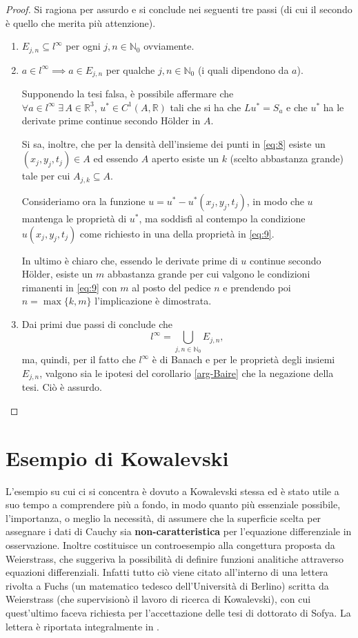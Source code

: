 \begin{proof}
Si ragiona per assurdo e si conclude nei seguenti tre passi (di cui il secondo è quello che merita più attenzione).
\begin{enumerate}
\item
$E_{j,n} \subseteq l^{\infty} $ per ogni $j,n \in \mathbb{N}_0$ ovviamente.
\item
$a \in l^{\infty} \implies a \in E_{j,n}$ per qualche $j,n \in \mathbb{N}_0$ (i quali  dipendono da $a$).

Supponendo la tesi falsa, è possibile affermare che $\forall a \in l^\infty \; \exists \, A \in \mathbb{R}^3, \, u^* \in C^1(A,\mathbb{R})$ tali che si ha che $Lu^*=S_a$ e che $u^*$ ha le derivate prime continue secondo Hölder in $A$.

Si sa, inoltre, che per la densità dell'insieme dei punti in \eqref{eq:8} esiste un $(x_j,y_j,t_j) \in A$ ed essendo $A$ aperto esiste un $k$ (scelto abbastanza grande) tale per cui $A_{j,k} \subseteq A$.

Consideriamo ora la funzione $u=u^*-u^*(x_j,y_j,t_j)$, in modo che $u$ mantenga le proprietà di $u^*$, ma soddisfi al contempo la condizione $u(x_j,y_j,t_j)$ come richiesto in una della proprietà in \eqref{eq:9}.

In ultimo è chiaro che, essendo le derivate prime di $u$ continue secondo Hölder, esiste un $m$ abbastanza grande per cui valgono le condizioni rimanenti in \eqref{eq:9} con $m$ al posto del pedice $n$ e prendendo poi $n=\max\{k,m\}$ l'implicazione è dimostrata.

\item
Dai primi due passi di conclude che $$l^{\infty}=\bigcup\limits_{j,n \in \mathbb{N}_0}E_{j,n},$$ ma, quindi, per il fatto che $l^{\infty}$ è di Banach e per le proprietà degli insiemi $E_{j,n}$, valgono sia le ipotesi del corollario \ref{arg-Baire} che la negazione della tesi. Ciò è assurdo.
\end{enumerate}
\end{proof}



\section{Esempio di Kowalevski}

L'esempio su cui ci si concentra è dovuto a Kowalevski stessa ed è stato utile a suo tempo a comprendere più a fondo, in modo quanto più essenziale possibile, l'importanza, o meglio la necessità, di assumere che la superficie scelta per assegnare i dati di Cauchy sia \textbf{non-caratteristica} per l'equazione differenziale in osservazione. Inoltre costituisce un controesempio alla congettura proposta da Weierstrass, che suggeriva la possibilità di definire funzioni analitiche attraverso equazioni differenziali. Infatti tutto ciò viene citato all'interno di una lettera rivolta a Fuchs (un matematico tedesco dell'Università di Berlino) scritta da Weierstrass (che supervisionò il lavoro di ricerca di  Kowalevski), con cui quest'ultimo faceva richiesta per l'accettazione delle tesi di dottorato di Sofya. La lettera è riportata integralmente in \cite[app.C]{Bio}.
 

